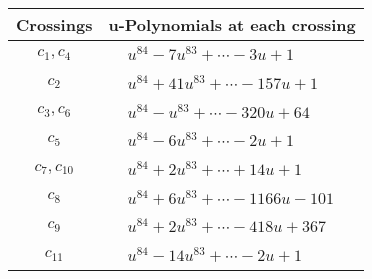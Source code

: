 \documentclass[1p]{elsarticle_modified}
\theoremstyle{definition}
\begin{document}
\begin{tabular}{m{50pt}|m{274pt}}
Crossings & \hspace{64pt}u-Polynomials at each crossing \\
\hline $$\begin{aligned}c_{1},c_{4}\end{aligned}$$&$\begin{aligned}
&u^{84}-7 u^{83}+\cdots-3 u+1
\end{aligned}$\\
\hline $$\begin{aligned}c_{2}\end{aligned}$$&$\begin{aligned}
&u^{84}+41 u^{83}+\cdots-157 u+1
\end{aligned}$\\
\hline $$\begin{aligned}c_{3},c_{6}\end{aligned}$$&$\begin{aligned}
&u^{84}- u^{83}+\cdots-320 u+64
\end{aligned}$\\
\hline $$\begin{aligned}c_{5}\end{aligned}$$&$\begin{aligned}
&u^{84}-6 u^{83}+\cdots-2 u+1
\end{aligned}$\\
\hline $$\begin{aligned}c_{7},c_{10}\end{aligned}$$&$\begin{aligned}
&u^{84}+2 u^{83}+\cdots+14 u+1
\end{aligned}$\\
\hline $$\begin{aligned}c_{8}\end{aligned}$$&$\begin{aligned}
&u^{84}+6 u^{83}+\cdots-1166 u-101
\end{aligned}$\\
\hline $$\begin{aligned}c_{9}\end{aligned}$$&$\begin{aligned}
&u^{84}+2 u^{83}+\cdots-418 u+367
\end{aligned}$\\
\hline $$\begin{aligned}c_{11}\end{aligned}$$&$\begin{aligned}
&u^{84}-14 u^{83}+\cdots-2 u+1
\end{aligned}$\\
\hline
\end{tabular}\\~\\
\end{document}
